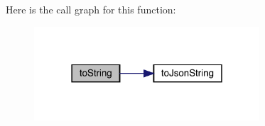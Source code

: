 Here is the call graph for this function\+:
\nopagebreak
\begin{figure}[H]
\begin{center}
\leavevmode
\includegraphics[width=238pt]{classcom_1_1toast_1_1android_1_1gamebase_1_1base_1_1_value_object_ad146fa8579a5f8a876c4688cc5a68520_cgraph}
\end{center}
\end{figure}
